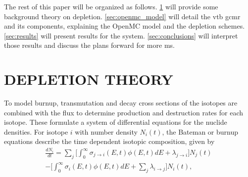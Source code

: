 \documentclass[letterpaper]{physor2024}
\begin{document}
The rest of this paper will be organized as follows. \cref{sec:depletion} will provide some background theory on depletion. \cref{sec:openmc_model}  will detail the \gls{vtb} \gls{gcmr} and its components, explaining the OpenMC model and the depletion schemes. \cref{sec:results} will present results for the system. \cref{sec:conclusions} will interpret those results and discuss the plans forward for more \gls{ms}.

\section{DEPLETION THEORY}\label{sec:depletion}


To model burnup, transmutation and decay cross sections of the isotopes are combined with the flux to determine production and destruction rates for each isotope. These formulate a system of differential equations for the nuclide densities. For isotope $i$ with number density $N_{i}(t)$, the Bateman or burnup equations describe the time dependent isotopic composition, given by
\vspace*{-0.1cm}
\begin{multline} \label{eq:batemen}
    \frac{dN_{i}}{dt} =
    \sum_{j} \bigg[\int_{0}^{\infty} \sigma_{j\rightarrow{i}}(E,t)\phi(E,t)dE + \lambda_{j\rightarrow{i}}\bigg]N_{j}(t) \\
    -\bigg[\int_{0}^{\infty} \sigma_{i}(E,t)\phi(E,t)dE
    +\sum_{j}\lambda_{i\rightarrow{j}}\bigg] N_{i}(t),
\end{multline}
\end{document}

